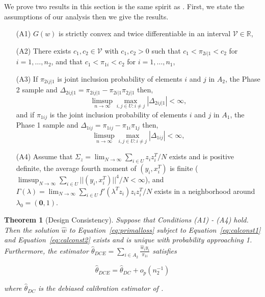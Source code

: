 \documentclass[12pt]{article}
\newtheorem{theorem}{Theorem}
\newcommand{\R}{\mathbb{R}}
\renewcommand{\bf}[1]{\mathbf{#1}}
\begin{document}
We prove two results in this section is the same spirit as \cite{kwon2024debiased}.
First, we state the assumptions of our analysis then we give the results.

\begin{itemize}
  \item[(A1)] $G(w)$ is strictly convex and twice differentiable in an interval
    $\mathcal{V} \in \R$,
  \item[(A2)] There exists $c_1, c_2 \in \mathcal{V}$ with $c_1, c_2 > 0$ such
    that $c_1 < \pi_{2i|1} < c_2$ for $i = 1, \dots, n_2$, and 
    that $c_1 < \pi_{1i} < c_2$ for $i = 1, \dots, n_1$,
  \item[(A3)] If $\pi_{2ij|1}$ is joint inclusion probability of elements $i$
    and $j$ in $A_2$, the Phase 2 sample and 
    $\Delta_{2ij|1} = \pi_{2ij|1} - \pi_{2i|1}\pi_{2j|1}$ then,
    $$\limsup_{n \to \infty} \max_{i,j \in U: i \neq j} |\Delta_{2ij|1}| <
    \infty,$$
    and if $\pi_{1ij}$ is the joint inclusion probability of elements $i$ and
    $j$ in $A_1$, the Phase 1 sample and 
    $\Delta_{1ij} = \pi_{1ij} - \pi_{1i}\pi_{1j}$ then,
    $$\limsup_{n \to \infty} \max_{i,j \in U: i \neq j} |\Delta_{1ij}| <
    \infty,$$
  \item[(A4)] Assume that $\Sigma_z = \lim_{N \to \infty} \sum_{i \in U} z_i
    z_i^T/N$ exists and is positive definite, the average fourth moment of $(y_i,
    x_i^T)$ is finite ($\limsup_{N \to \infty} \sum_{i \in U} ||(y_i, x_i^T)||^4
    / N < \infty$), and $\Gamma(\lambda) = \lim_{N \to \infty}  \sum_{i \in U}
    f'(\lambda^T z_i) z_i z_i^T / N$ exists in a neighborhood around $\lambda_0
    = (\bf 0, 1)$.
\end{itemize}

\begin{theorem}[Design Consistency]
  Suppose that Conditions (A1) - (A4) hold. Then the solution $\hat w$ to 
  Equation~\ref{eq:primalloss} subject to Equation~\ref{eq:calconst1} and 
  Equation~\ref{eq:calconst2} 
  exists and is unique with probability approaching 1. Furthermore, the
  estimator $\hat \theta_{DCE} = \sum_{i \in A_2} \frac{\hat w_i y_i}{\pi_{1i}}$
  satisfies

  $$\hat \theta_{DCE} = \hat \theta_{DC} + o_p(n_2^{-1})$$

  where $\hat \theta_{DC}$ is the debiased calibration estimator of 
  \cite{kwon2024debiased}.

\end{theorem}
\end{document}
